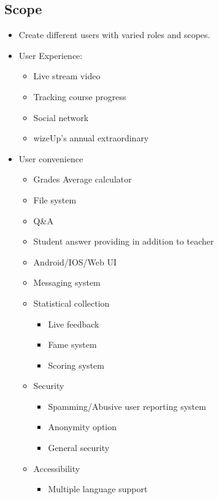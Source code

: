 \documentclass[12pt,a4paper]{article}
\begin{document}
    \newpage

    \subsection{Scope}\label{section:_Toc146371246}
    \begin{itemize}
        \item Create different users with varied roles and scopes.
        \item User Experience:
        \begin{itemize}
            \item Live stream video
            \item Tracking course progress
            \item Social network
            \item wizeUp's annual extraordinary
        \end{itemize}
        \item User convenience
        \begin{itemize}
            \item Grades Average calculator
            \item File system
            \item Q\&A
            \item Student answer providing in addition to teacher
            \item Android/IOS/Web UI
            \item Messaging system
            \item Statistical collection
            \begin{itemize}
                \item Live feedback
                \item Fame system
                \item Scoring system
            \end{itemize}
            \item Security
            \begin{itemize}
                \item Spamming/Abusive user reporting system
                \item Anonymity option
                \item General security
            \end{itemize}
            \item Accessibility
            \begin{itemize}
                \item Multiple language support
            \end{itemize}
        \end{itemize}
    \end{itemize}
    \newpage
\end{document}
